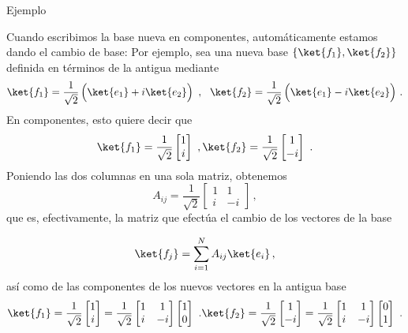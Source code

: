 \documentclass[a4paper,11pt]{book} %
\numberwithin{equation}{chapter}
\begin{document}
	\begin{mybox_green}{Ejemplo}

Cuando escribimos la base nueva en componentes, automáticamente estamos dando el cambio de base:
Por ejemplo, sea una nueva base $\{\ket{f_1},\ket{f_2}\}$ definida en términos de la antigua mediante 
\begin{equation}
\ket{f_1} = \frac{1}{\sqrt{2}}\left(\rule{0mm}{4mm}\ket{e_1} + i\ket{e_2}\right)~,~~\ket{f_2} = \frac{1}{\sqrt{2}}\left( \rule{0mm}{4mm}\ket{e_1} - i\ket{e_2}\right)\, .
\end{equation}
En componentes, esto quiere decir que
\begin{equation}
\ket{f_1} = \frac{1}{\sqrt{2}}\begin{bmatrix} 1 \\i \end{bmatrix}~,
\ket{f_2} = \frac{1}{\sqrt{2}}\begin{bmatrix} 1 \\-i \end{bmatrix}~.
\end{equation}
Poniendo las dos columnas en una sola matriz, obtenemos   
\begin{equation}
A_{ij} = \frac{1}{\sqrt{2}}\begin{bmatrix} 1 & 1 \\ i & -i \end{bmatrix}\, ,
\end{equation}
que es, efectivamente, la matriz que efectúa el cambio de los vectores de la base

\begin{equation}
\ket{f_j} = \sum_{i=1}^N A_{i j}\ket{e_{i}} \, ,
\end{equation}
así como de las componentes de los nuevos vectores en la antigua base
\begin{equation}
\ket{f_1} = \frac{1}{\sqrt{2}}\begin{bmatrix} 1 \\i \end{bmatrix} = \frac{1}{\sqrt{2}}\begin{bmatrix} 1 & 1 \\ i & -i \end{bmatrix}\begin{bmatrix} 1 \\0 \end{bmatrix}~.
\ket{f_2} = \frac{1}{\sqrt{2}}\begin{bmatrix} 1 \\-i \end{bmatrix} = \frac{1}{\sqrt{2}}\begin{bmatrix} 1 & 1 \\ i & -i \end{bmatrix}\begin{bmatrix} 0 \\1 \end{bmatrix}~.
\end{equation}
\end{mybox_green}
\end{document}
